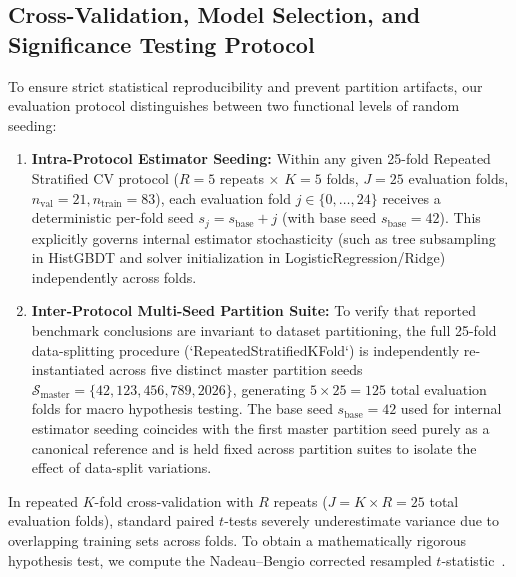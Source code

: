 \documentclass[preprint,12pt]{elsarticle}
\begin{document}
\subsection{Cross-Validation, Model Selection, and Significance Testing Protocol}
\label{sec:cv_protocol}
To ensure strict statistical reproducibility and prevent partition artifacts, our evaluation protocol distinguishes between two functional levels of random seeding:
\begin{enumerate}
    \item \textbf{Intra-Protocol Estimator Seeding:} Within any given 25-fold Repeated Stratified CV protocol ($R=5$ repeats $\times$ $K=5$ folds, $J=25$ evaluation folds, $n_{\text{val}} = 21, n_{\text{train}} = 83$), each evaluation fold $j \in \{0, \dots, 24\}$ receives a deterministic per-fold seed $s_j = s_{\text{base}} + j$ (with base seed $s_{\text{base}} = 42$). This explicitly governs internal estimator stochasticity (such as tree subsampling in HistGBDT and solver initialization in LogisticRegression/Ridge) independently across folds.
    \item \textbf{Inter-Protocol Multi-Seed Partition Suite:} To verify that reported benchmark conclusions are invariant to dataset partitioning, the full 25-fold data-splitting procedure (`RepeatedStratifiedKFold`) is independently re-instantiated across five distinct master partition seeds $\mathcal{S}_{\text{master}} = \{42, 123, 456, 789, 2026\}$, generating $5 \times 25 = 125$ total evaluation folds for macro hypothesis testing. The base seed $s_{\text{base}} = 42$ used for internal estimator seeding coincides with the first master partition seed purely as a canonical reference and is held fixed across partition suites to isolate the effect of data-split variations.
\end{enumerate}

In repeated $K$-fold cross-validation with $R$ repeats ($J = K \times R = 25$ total evaluation folds), standard paired $t$-tests severely underestimate variance due to overlapping training sets across folds. To obtain a mathematically rigorous hypothesis test, we compute the Nadeau--Bengio corrected resampled $t$-statistic~\cite{nadeau2003}.
\end{document}
